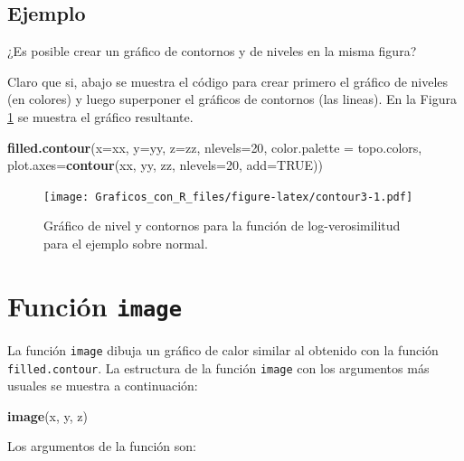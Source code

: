 \documentclass[10pt,]{krantz}
\makeatletter
\newenvironment{Shaded}{\begin{snugshade}}{\end{snugshade}}
\newcommand{\KeywordTok}[1]{\textcolor[rgb]{0.13,0.29,0.53}{\textbf{#1}}}
\newcommand{\DataTypeTok}[1]{\textcolor[rgb]{0.13,0.29,0.53}{#1}}
\newcommand{\DecValTok}[1]{\textcolor[rgb]{0.00,0.00,0.81}{#1}}
\newcommand{\OtherTok}[1]{\textcolor[rgb]{0.56,0.35,0.01}{#1}}
\newcommand{\NormalTok}[1]{#1}
\newenvironment{kframe}{%
\medskip{}
\setlength{\fboxsep}{.8em}
 \def\at@end@of@kframe{}%
 \ifinner\ifhmode%
  \def\at@end@of@kframe{\end{minipage}}%
  \begin{minipage}{\columnwidth}%
 \fi\fi%
 \def\FrameCommand##1{\hskip\@totalleftmargin \hskip-\fboxsep
 \colorbox{shadecolor}{##1}\hskip-\fboxsep
     \hskip-\linewidth \hskip-\@totalleftmargin \hskip\columnwidth}%
 \MakeFramed {\advance\hsize-\width
   \@totalleftmargin\z@ \linewidth\hsize
   \@setminipage}}%
 {\par\unskip\endMakeFramed%
 \at@end@of@kframe}
\renewenvironment{Shaded}{\begin{kframe}}{\end{kframe}}
\makeatother
\begin{document}
\subsection*{Ejemplo}\label{ejemplo-23}


¿Es posible crear un gráfico de contornos y de niveles en la misma
figura?

Claro que si, abajo se muestra el código para crear primero el gráfico
de niveles (en colores) y luego superponer el gráficos de contornos (las
lineas). En la Figura \ref{fig:contour3} se muestra el gráfico
resultante.

\begin{Shaded}
\begin{Highlighting}[]
\KeywordTok{filled.contour}\NormalTok{(}\DataTypeTok{x=}\NormalTok{xx, }\DataTypeTok{y=}\NormalTok{yy, }\DataTypeTok{z=}\NormalTok{zz,  }\DataTypeTok{nlevels=}\DecValTok{20}\NormalTok{,}
               \DataTypeTok{color.palette =}\NormalTok{ topo.colors, }
               \DataTypeTok{plot.axes=}\KeywordTok{contour}\NormalTok{(xx, yy, zz, }\DataTypeTok{nlevels=}\DecValTok{20}\NormalTok{, }\DataTypeTok{add=}\OtherTok{TRUE}\NormalTok{))}
\end{Highlighting}
\end{Shaded}

\begin{figure}
\centering
\texttt{[image: Graficos\_con\_R\_files/figure-latex/contour3-1.pdf]}
\caption{\label{fig:contour3}Gráfico de nivel y contornos para la función de
log-verosimilitud para el ejemplo sobre normal.}
\end{figure}

\section{\texorpdfstring{Función \texttt{image}
}{Función image }}\label{funcion-image}

La función \texttt{image} dibuja un gráfico de calor similar al obtenido
con la función \texttt{filled.contour}. La estructura de la función
\texttt{image} con los argumentos más usuales se muestra a continuación:

\begin{Shaded}
\begin{Highlighting}[]
\KeywordTok{image}\NormalTok{(x, y, z)}
\end{Highlighting}
\end{Shaded}

Los argumentos de la función son:
\end{document}
